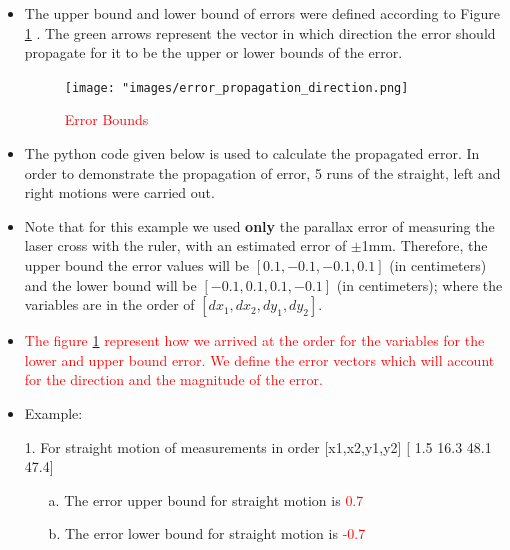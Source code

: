 {\begin{itemize}
           
            
               
          \item The upper bound and lower bound of errors were defined according to Figure \ref{fig:Error Bounds} . The green arrows represent the vector in which direction the error should propagate for it to be the upper or lower bounds of the error.    
          
          \begin{figure}[ht!] 
                        \centering
                        \texttt{[image: "images/error\_propagation\_direction.png]}
                        \caption{\textcolor{red}{Error Bounds}}
                        \label{fig:Error Bounds}
         \end{figure}
                
                
            
        \item The python code given below is used to calculate the propagated error. In order to demonstrate the propagation of error, 5 runs of the straight, left and right motions were carried out. 
        
        \item Note that for this example we used \textbf{only} the parallax error of measuring the laser cross with the ruler, with an estimated error of $\pm$1mm. Therefore, the upper bound the error values will be $[0.1, -0.1, -0.1, 0.1]$ (in centimeters) and the lower bound will be $[-0.1, 0.1, 0.1, -0.1]$ (in centimeters); where the variables are in the order of $[dx_1, dx_2, dy_1, dy_2]$.
        
        \item \textcolor{red}{The figure \ref{fig:Error Bounds} represent how we arrived at the order for the variables for the lower and upper bound error. We define the error vectors which will account for the direction and the magnitude of the error. }
        
        \item Example:
        
        \item[1.] For straight motion of measurements in order [x1,x2,y1,y2] [ 1.5 16.3 48.1 47.4]
        
        \begin{itemize}
            \item[a.] The error upper bound for straight motion is \textcolor{red}{0.7 \textdegree}
            \item[b.] The error lower bound for straight motion is \textcolor{red}{-0.7 \textdegree}
        \end{itemize}
        

\end{itemize}}
